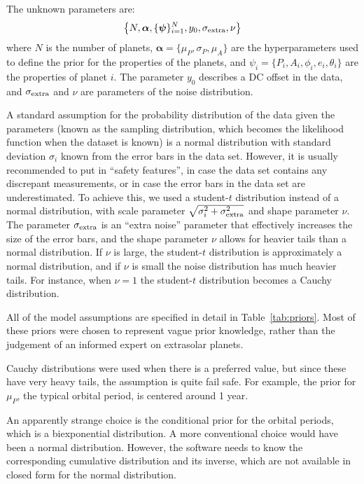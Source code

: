 \documentclass[useAMS,usenatbib]{mn2e}
\begin{document}
The unknown parameters are:
\begin{eqnarray}
\left\{N, \boldsymbol{\alpha}, \{\boldsymbol{\psi}\}_{i=1}^N, y_0, \sigma_{\rm extra}, \nu\right\}
\end{eqnarray}
where $N$ is the number of planets,
$\boldsymbol{\alpha} = \{\mu_P, \sigma_P, \mu_A\}$ are the
hyperparameters used to define the prior for the properties of the planets,
and $\psi_i = \{P_i, A_i, \phi_i, e_i, \theta_i\}$
are the properties of planet $i$.
The parameter $y_0$ describes a DC offset in the data, and
$\sigma_{\rm extra}$ and $\nu$ are parameters of the noise distribution.

A standard assumption for the probability distribution of the data given the
parameters (known as the sampling distribution, which becomes the likelihood
function when the dataset is known) is a normal distribution with
standard deviation $\sigma_i$ known from the error bars in the data set.
However, it is usually recommended to put in ``safety features'', in case the
data set contains any discrepant measurements, or in case the error bars in the
data set are underestimated. To achieve this, we used a student-$t$ distribution
instead of a normal distribution, with
scale parameter $\sqrt{\sigma_i^2 + \sigma_{\rm extra}^2}$ and shape parameter $\nu$. The
parameter $\sigma_{\rm extra}$ is an ``extra noise'' parameter that effectively increases the
size of the error bars, and the shape parameter $\nu$ allows for heavier tails
than a normal distribution. If $\nu$ is large, the student-$t$ distribution
is approximately a normal distribution, and if $\nu$ is small the noise
distribution has much heavier tails. For instance, when $\nu=1$ the student-$t$
distribution becomes a Cauchy distribution.

All of the model assumptions are specified in detail in
Table~\ref{tab:priors}. Most of these priors were chosen to represent vague
prior knowledge, rather than the judgement of an informed expert on extrasolar
planets.

Cauchy distributions were used when there is a
preferred value, but since these have very heavy tails, the assumption is
quite fail safe. For example, the prior for $\mu_P$, the typical orbital period,
is centered around 1 year.

An apparently strange choice is the conditional prior for the orbital
periods, which is a biexponential distribution. A more conventional choice
would have been a normal distribution. However, the \citet{rjobject} software
needs to know the corresponding cumulative distribution and its inverse, which
are not available in closed form for the normal distribution.
\end{document}
